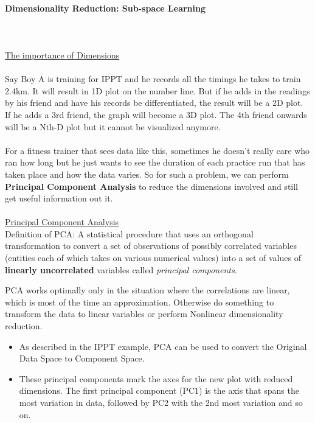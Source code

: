 \documentclass[a4paper]{article}
\begin{document}
\paragraph{Dimensionality Reduction: Sub-space Learning}\mbox{}\\
\\
\underline{The importance of Dimensions}\\
\\
Say Boy A is training for IPPT and he records all the timings he takes to train 2.4km. It will result in 1D plot on the number line. But if he adds in the readings by his friend and have his records be differentiated, the result will be a 2D plot. If he adds a 3rd friend, the graph will become a 3D plot. The 4th friend onwards will be a Nth-D plot but it cannot be visualized anymore.\\
\\
\noindent For a fitness trainer that sees data like this, sometimes he doesn't really care who ran how long but he just wants to see the duration of each practice run that has taken place and how the data varies. So for such a problem, we can perform \textbf{Principal Component Analysis} to reduce the dimensions involved and still get useful information out it.\\
\\
\noindent \underline{Principal Component Analysis}\mbox{}\\
Definition of PCA: A statistical procedure that uses an orthogonal transformation to convert a set of observations of possibly correlated variables (entities each of which takes on various numerical values) into a set of values of \textbf{linearly uncorrelated} variables called \textit{principal components}.
\begin{framed}
	\begin{displayquote}
		PCA works optimally only in the situation where the correlations are linear, which is most of the time an approximation. Otherwise do something to transform the data to linear variables or perform Nonlinear dimensionality reduction.
	\end{displayquote}
\end{framed}
\begin{itemize}
	\item As described in the IPPT example, PCA can be used to convert the Original Data Space to Component Space.
	\item These principal components mark the axes for the new plot with reduced dimensions. The first principal component (PC1) is the axis that spans the most variation in data, followed by PC2 with the 2nd most variation and so on.
\end{itemize}
\end{document}
